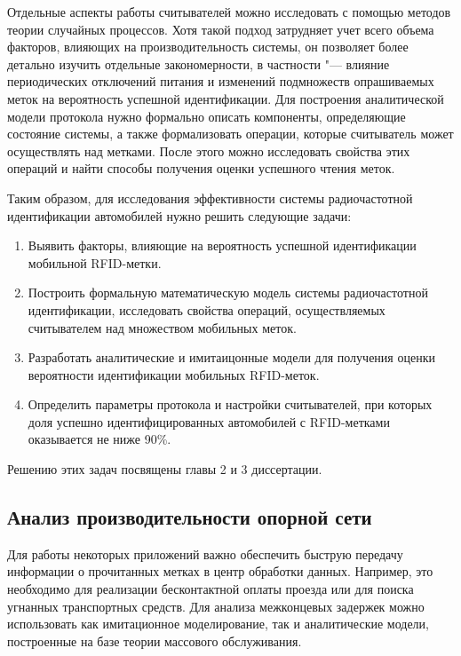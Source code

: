 Отдельные аспекты работы считывателей можно исследовать с помощью методов теории случайных процессов. Хотя такой подход затрудняет учет всего объема факторов, влияющих на производительность системы, он позволяет более детально изучить отдельные закономерности, в частности "--- влияние периодических отключений питания и изменений подмножеств опрашиваемых меток на вероятность успешной идентификации. Для построения аналитической модели протокола нужно формально описать компоненты, определяющие состояние системы, а также формализовать операции, которые считыватель может осуществлять над метками. После этого можно исследовать свойства этих операций и найти способы получения оценки успешного чтения меток.

Таким образом, для исследования эффективности системы радиочастотной идентификации автомобилей нужно решить следующие задачи:

\begin{enumerate}
    \item Выявить факторы, влияющие на вероятность успешной идентификации мобильной RFID-метки.
    \item Построить формальную математическую модель системы радиочастотной идентификации, исследовать свойства операций, осуществляемых считывателем над множеством мобильных меток.
    \item Разработать аналитические и имитаицонные модели для получения оценки вероятности идентификации мобильных RFID-меток.
    \item Определить параметры протокола и настройки считывателей, при которых доля успешно идентифицированных автомобилей с RFID-метками оказывается не ниже 90\%.
\end{enumerate}

Решению этих задач посвящены главы 2 и 3 диссертации.



\subsection{Анализ производительности опорной сети}

Для работы некоторых приложений важно обеспечить быструю передачу информации о прочитанных метках в центр обработки данных. Например, это необходимо для реализации бесконтактной оплаты проезда или для поиска угнанных транспортных средств. Для анализа межконцевых задержек можно использовать как имитационное моделирование, так и аналитические модели, построенные на базе теории массового обслуживания.

